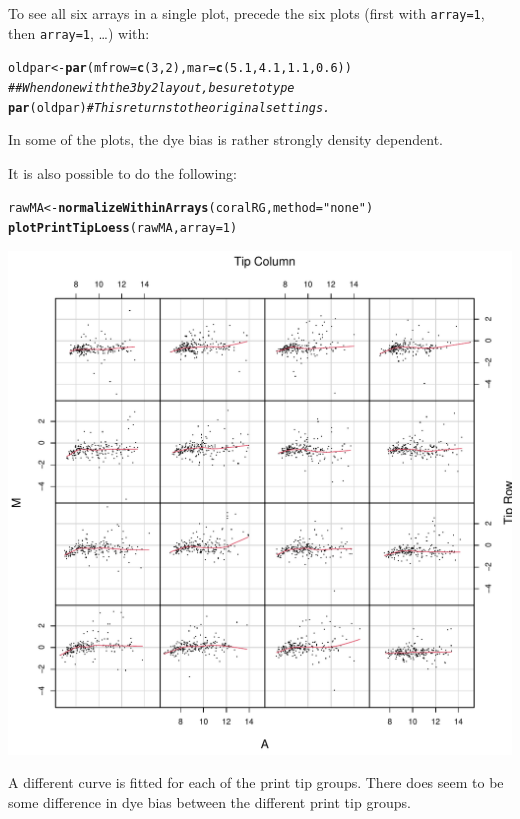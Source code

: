 \documentclass[a4paper,9pt]{article}\usepackage[]{graphicx}\usepackage[]{color}
\makeatletter
\def\maxwidth{ %
  \ifdim\Gin@nat@width>\linewidth
    \linewidth
  \else
    \Gin@nat@width
  \fi
}
\newcommand{\hlnum}[1]{\textcolor[rgb]{0.686,0.059,0.569}{#1}}%
\newcommand{\hlstr}[1]{\textcolor[rgb]{0.192,0.494,0.8}{#1}}%
\newcommand{\hlcom}[1]{\textcolor[rgb]{0.678,0.584,0.686}{\textit{#1}}}%
\newcommand{\hlstd}[1]{\textcolor[rgb]{0.345,0.345,0.345}{#1}}%
\newcommand{\hlkwb}[1]{\textcolor[rgb]{0.69,0.353,0.396}{#1}}%
\newcommand{\hlkwc}[1]{\textcolor[rgb]{0.333,0.667,0.333}{#1}}%
\newcommand{\hlkwd}[1]{\textcolor[rgb]{0.737,0.353,0.396}{\textbf{#1}}}%
\newenvironment{kframe}{%
 \def\at@end@of@kframe{}%
 \ifinner\ifhmode%
  \def\at@end@of@kframe{\end{minipage}}%
  \begin{minipage}{\columnwidth}%
 \fi\fi%
 \def\FrameCommand##1{\hskip\@totalleftmargin \hskip-\fboxsep
 \colorbox{shadecolor}{##1}\hskip-\fboxsep
     \hskip-\linewidth \hskip-\@totalleftmargin \hskip\columnwidth}%
 \MakeFramed {\advance\hsize-\width
   \@totalleftmargin\z@ \linewidth\hsize
   \@setminipage}}%
 {\par\unskip\endMakeFramed%
 \at@end@of@kframe}
\newenvironment{knitrout}{}{} %
\makeatother
\begin{document}
To see all six arrays in a single plot, precede the six plots
(first with \texttt{array=1}, then \texttt{array=1}, \ldots)
with:
\begin{knitrout}
\color{fgcolor}\begin{kframe}
\begin{alltt}
\hlstd{oldpar} \hlkwb{<-} \hlkwd{par}\hlstd{(}\hlkwc{mfrow}\hlstd{=}\hlkwd{c}\hlstd{(}\hlnum{3}\hlstd{,}\hlnum{2}\hlstd{),} \hlkwc{mar}\hlstd{=}\hlkwd{c}\hlstd{(}\hlnum{5.1}\hlstd{,} \hlnum{4.1}\hlstd{,} \hlnum{1.1}\hlstd{,} \hlnum{0.6}\hlstd{))}
\hlcom{## When done with the 3 by 2 layout, be sure to type}
\hlkwd{par}\hlstd{(oldpar)}     \hlcom{# This returns to the original settings.}
\end{alltt}
\end{kframe}
\end{knitrout}
In some of the plots, the dye bias is rather strongly density dependent.

It is also possible to do the following:
\begin{knitrout}
\color{fgcolor}\begin{kframe}
\begin{alltt}
\hlstd{rawMA} \hlkwb{<-} \hlkwd{normalizeWithinArrays}\hlstd{(coralRG,} \hlkwc{method} \hlstd{=} \hlstr{"none"}\hlstd{)}
\hlkwd{plotPrintTipLoess}\hlstd{(rawMA,} \hlkwc{array}\hlstd{=}\hlnum{1}\hlstd{)}
\end{alltt}
\end{kframe}
\includegraphics[width=\maxwidth]{figure/unnamed-chunk-8-1} 

\end{knitrout}
A different curve is fitted for each of the print tip groups.
There does seem to be some difference in dye bias between the
different print tip groups.
\end{document}
